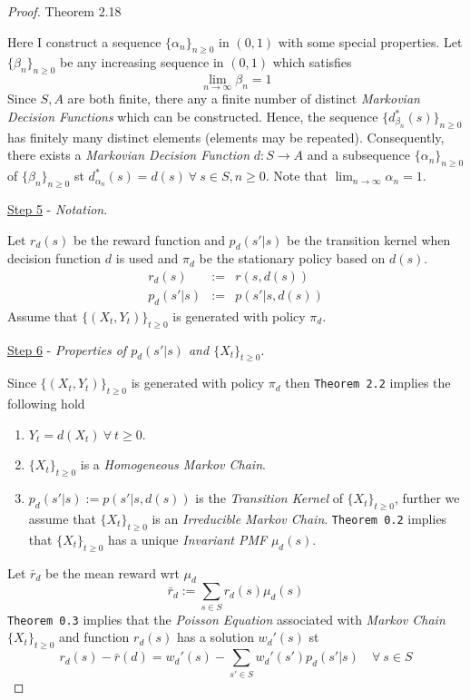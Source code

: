 \documentclass[11pt,a4paper]{article}
\begin{document}
\begin{proof}{Theorem 2.18}
    \par Here I construct a sequence $\{\alpha_n\}_{n\geq0}$ in $(0,1)$ with some special properties. Let $\{\beta_n\}_{n\geq0}$ be any increasing sequence in $(0,1)$ which satisfies
    \[ \lim_{n\to\infty}\beta_n=1 \]
    Since $S,A$ are both finite, there any a finite number of distinct \textit{Markovian Decision Functions} which can be constructed. Hence, the sequence $\{d_{\beta_n}^*(s)\}_{n\geq0}$ has finitely many distinct elements (elements may be repeated). Consequently, there exists a \textit{Markovian Decision Function} $d:S\to A$ and a subsequence $\{\alpha_n\}_{n\geq0}$ of $\{\beta_n\}_{n\geq0}$ st $d_{\alpha_n}^*(s)=d(s)\ \forall\ s\in S,n\geq0$. Note that $\lim_{n\to\infty}\alpha_n=1$.
    \par \underline{Step 5} - \textit{Notation}.
    \par Let $r_d(s)$ be the reward function and $p_d(s'|s)$ be the transition kernel when decision function $d$ is used and $\pi_d$ be the stationary policy based on $d(s)$.
    \[\begin{array}{rcl}
      r_d(s)&:=&r(s,d(s))\\
      p_d(s'|s)&:=&p(s'|s,d(s))
    \end{array}\]
    Assume that $\{(X_t,Y_t)\}_{t\geq0}$ is generated with policy $\pi_d$.
    \par \underline{Step 6} - \textit{Properties of $p_d(s'|s)$ and $\{X_t\}_{t\geq0}$}.
    \par Since $\{(X_t,Y_t)\}_{t\geq0}$ is generated with policy $\pi_d$ then \texttt{Theorem 2.2}  implies the following hold
    \begin{enumerate}
      \item $Y_t=d(X_t)\ \forall\ t\geq0$.
      \item $\{X_t\}_{t\geq0}$ is a \textit{Homogeneous Markov Chain}.
      \item $p_d(s'|s):=p(s'|s,d(s))$ is the \textit{Transition Kernel} of $\{X_t\}_{t\geq0}$, further we assume that $\{X_t\}_{t\geq0}$ is an \textit{Irreducible Markov Chain}. \texttt{Theorem 0.2}  implies that $\{X_t\}_{t\geq0}$ has a unique \textit{Invariant PMF} $\mu_d(s)$.
    \end{enumerate}
    Let $\bar{r}_d$ be the mean reward wrt $\mu_d$
    \[ \bar{r}_d:=\sum_{s\in S}r_d(s)\mu_d(s) \]
    \texttt{Theorem 0.3} implies that the \textit{Poisson Equation} associated with \textit{Markov Chain} $\{X_t\}_{t\geq0}$ and function $r_d(s)$ has a solution $w_d'(s)$ st
    \[ r_d(s)-\bar{r}(d)=w_d'(s)-\sum_{s'\in S}w_d'(s')p_d(s'|s)\quad\forall\ s\in S \]

\end{proof}
\end{document}
